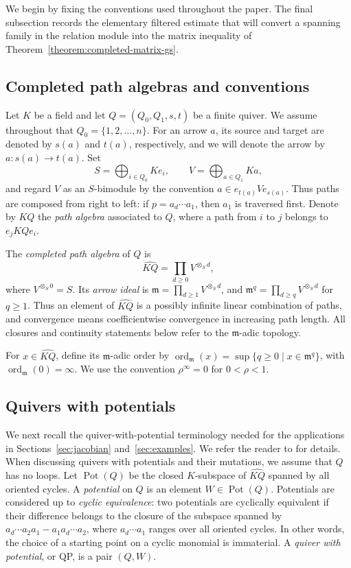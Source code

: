 \documentclass[11pt,letterpaper,reqno]{amsart}
\theoremstyle{definition}
\DeclareMathOperator{\ord}{ord}
\newcommand{\m}{\mathfrak m}
\newcommand{\widehatKQ}{\widehat{KQ}}
\begin{document}
	We begin by fixing the conventions used throughout the paper.  The final subsection records the elementary filtered estimate that will convert a spanning family in the relation module into the matrix inequality of Theorem~\ref{theorem:completed-matrix-gs}.
	
	\subsection{Completed path algebras and conventions}
	
	Let $K$ be a field and let $Q=(Q_0,Q_1,s,t)$ be a finite quiver.  We assume
	throughout that $Q_0=\{1,2,\ldots,n\}$.  For an arrow $a$, its source and
	target are denoted by $s(a)$ and $t(a)$, respectively, and we will denote the arrow by $a: s(a)\rightarrow t(a)$.  Set
	\[
	S=\bigoplus_{i\in Q_0}Ke_i,
	\qquad
	V=\bigoplus_{a\in Q_1}Ka,
	\]
	and regard $V$ as an $S$-bimodule by the convention
	$a\in e_{t(a)}Ve_{s(a)}$.  Thus paths are composed from right to left: if $p=a_d\cdots a_1$, then $a_1$ is traversed first. Denote by $KQ$ the \emph{path algebra} associated to $Q$, where a path from $i$ to $j$ belongs to $e_jKQe_i$.
	
	The \emph{completed path algebra} of $Q$ is
	\[
	\widehatKQ=\prod_{d\geq0}V^{\otimes_S d},
	\]
	where $V^{\otimes_S0}=S$. Its \emph{arrow ideal} is
	$\m=\prod_{d\geq1}V^{\otimes_S d}$, and
	$\m^q=\prod_{d\geq q}V^{\otimes_Sd}$ for $q\geq1$. Thus an element of $\widehatKQ$ is a possibly infinite linear combination of
	paths, and convergence means coefficientwise convergence in increasing path
	length.  All closures and continuity statements below refer to the
	$\m$-adic topology.
	
	For $x\in\widehatKQ$, define its $\m$-adic order by
	$\ord_{\m}(x)=\sup\{q\geq0\mid x\in\m^q\}$, with
	$\ord_{\m}(0)=\infty$.
	We use the convention $\rho^\infty=0$ for $0<\rho<1$.
	
	\subsection{Quivers with potentials}
	
	We next recall the quiver-with-potential terminology needed for the applications in Sections~\ref{sec:jacobian} and~\ref{sec:examples}. We refer the reader to \cite{DerksenWeymanZelevinsky} for details. When discussing quivers with potentials and their mutations, we assume that
	$Q$ has no loops.  Let
	$\operatorname{Pot}(Q)$ be the closed $K$-subspace of $\widehatKQ$ spanned by
	all oriented cycles.  A \emph{potential} on $Q$ is an element
	$W\in\operatorname{Pot}(Q)$.  Potentials are considered up to
	\emph{cyclic equivalence}: two potentials are cyclically equivalent if their
	difference belongs to the closure of the subspace spanned by $a_d\cdots a_2a_1-a_1a_d\cdots a_2$, where $a_d\cdots a_1$ ranges over all oriented cycles.  In other words, the
	choice of a starting point on a cyclic monomial is immaterial.  A
	\emph{quiver with potential}, or QP, is a pair $(Q,W)$.
	
\end{document}
